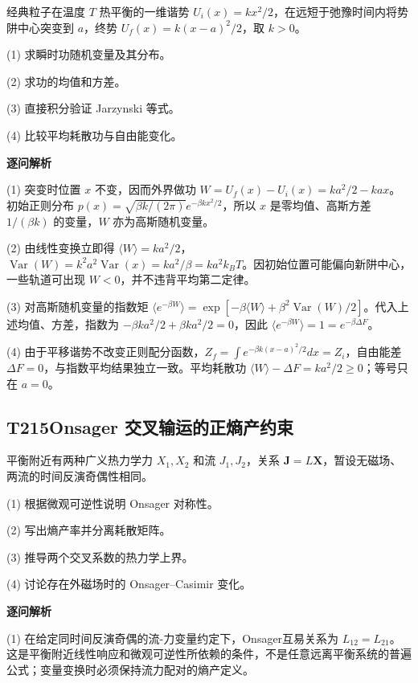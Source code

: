 经典粒子在温度 $T$ 热平衡的一维谐势 $U_i(x)=kx^2/2$，在远短于弛豫时间内将势阱中心突变到 $a$，终势 $U_f(x)=k(x-a)^2/2$，取 $k>0$。

(1) 求瞬时功随机变量及其分布。

(2) 求功的均值和方差。

(3) 直接积分验证 Jarzynski 等式。

(4) 比较平均耗散功与自由能变化。

\par\textbf{逐问解析}

(1) 突变时位置 $x$ 不变，因而外界做功 $W=U_f(x)-U_i(x)=ka^2/2-kax$。初始正则分布 $p(x)=\sqrt{\beta k/(2\pi)}e^{-\beta kx^2/2}$，所以 $x$ 是零均值、高斯方差 $1/(\beta k)$ 的变量，$W$ 亦为高斯随机变量。

(2) 由线性变换立即得 $\langle W\rangle=ka^2/2$，$\operatorname{Var}(W)=k^2a^2\operatorname{Var}(x)=ka^2/\beta=ka^2k_BT$。因初始位置可能偏向新阱中心，一些轨道可出现 $W<0$，并不违背平均第二定律。

(3) 对高斯随机变量的指数矩 $\langle e^{-\beta W}\rangle=\exp[-\beta\langle W\rangle+\beta^2\operatorname{Var}(W)/2]$。代入上述均值、方差，指数为 $-\beta ka^2/2+\beta ka^2/2=0$，因此 $\langle e^{-\beta W}\rangle=1=e^{-\beta\Delta F}$。

(4) 由于平移谐势不改变正则配分函数，$Z_f=\int e^{-\beta k(x-a)^2/2}dx=Z_i$，自由能差 $\Delta F=0$，与指数平均结果独立一致。平均耗散功 $\langle W\rangle-\Delta F=ka^2/2\ge0$；等号只在 $a=0$。

\par\medskip

\subsection*{T215\quad Onsager 交叉输运的正熵产约束}

平衡附近有两种广义热力学力 $X_1,X_2$ 和流 $J_1,J_2$，关系 $\mathbf J=L\mathbf X$，暂设无磁场、两流的时间反演奇偶性相同。

(1) 根据微观可逆性说明 Onsager 对称性。

(2) 写出熵产率并分离耗散矩阵。

(3) 推导两个交叉系数的热力学上界。

(4) 讨论存在外磁场时的 Onsager–Casimir 变化。

\par\textbf{逐问解析}

(1) 在给定同时间反演奇偶的流-力变量约定下，Onsager互易关系为 $L_{12}=L_{21}$。这是平衡附近线性响应和微观可逆性所依赖的条件，不是任意远离平衡系统的普遍公式；变量变换时必须保持流力配对的熵产定义。


